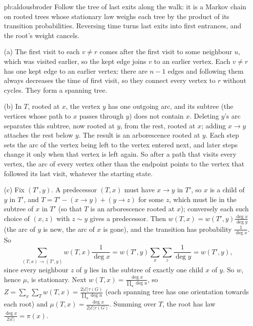 \begin{solution}{pb:aldousbroder}
\idea Follow the tree of last exits along the walk: it is a Markov chain on rooted trees whose stationary law weighs each tree by the
product of its transition probabilities. Reversing time turns last exits into first entrances, and the root's weight cancels.

\writeup (a) The first visit to each $v\ne r$ comes after the first visit to some neighbour $u$, which was visited earlier, so the kept edge joins $v$ to an
earlier vertex. Each $v\ne r$ has one kept edge to an earlier vertex: there are $n-1$ edges and following them always decreases the time of first
visit, so they connect every vertex to $r$ without cycles. They form a spanning tree.

(b) In $T$, rooted at $x$, the vertex $y$ has one outgoing arc, and its subtree (the vertices whose path to $x$ passes through $y$) does not contain
$x$. Deleting $y$'s arc separates this subtree, now rooted at $y$, from the rest, rooted at $x$; adding $x\to y$ attaches the rest below $y$. The result is
an arborescence rooted at $y$. Each step sets the arc of the vertex being left to the vertex entered next, and later steps change it only
when that vertex is left again. So after a path that visits every vertex, the arc of every vertex other than the endpoint points to the
vertex that followed its last visit, whatever the starting state.

(c) Fix $(T',y)$. A predecessor $(T,x)$ must have $x\to y$ in $T'$, so $x$ is a child of $y$ in $T'$, and $T=T'-(x\to y)+(y\to z)$ for some $z$, which must lie in the
subtree of $x$ in $T'$ (so that $T$ is an arborescence rooted at $x$); conversely each such choice of $(x,z)$ with $z\sim y$ gives a predecessor. Then
$w(T,x)=w(T',y)\frac{\deg x}{\deg y}$ (the arc of $y$ is new, the arc of $x$ is gone), and the transition has probability $\frac1{\deg x}$. So
\[
\sum_{(T,x)\to(T',y)}w(T,x)\frac1{\deg x}=w(T',y)\sum_{x}\sum_{z}\frac1{\deg y}=w(T',y),
\]
since every neighbour $z$ of $y$ lies in the subtree of exactly one child $x$ of $y$. So $w$, hence $\mu$, is stationary. Next $w(T,x)=\frac{\deg x}{\prod_u\deg u}$, so
$Z=\sum_x\sum_Tw(T,x)=\frac{2|\mathcal E|\tau(G)}{\prod_u\deg u}$ (each spanning tree has one orientation towards each root) and $\mu(T,x)=\frac{\deg x}{2|\mathcal E|\tau(G)}$. Summing over $T$, the root has law
$\frac{\deg x}{2|\mathcal E|}=\pi(x)$.


\end{solution}

